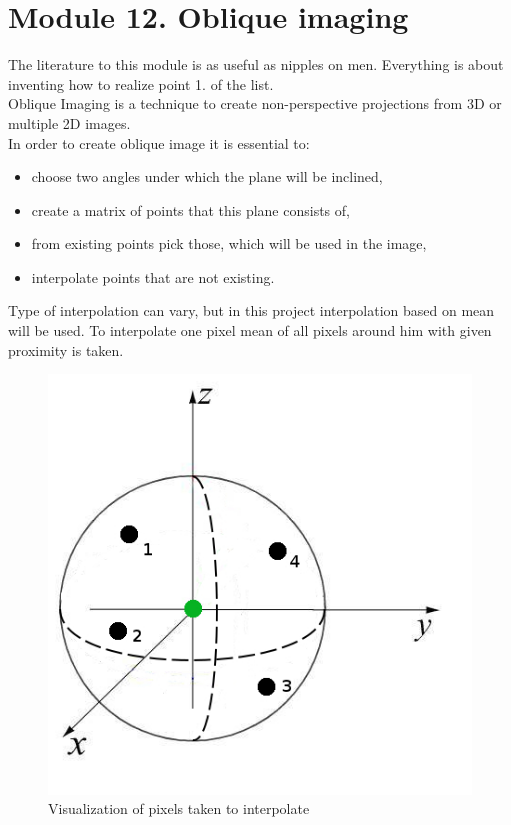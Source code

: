 \section{Module 12. Oblique imaging}

\indent The literature to this module is as useful as nipples on
men. Everything is about inventing how to realize point 1. of the
list. \\
 \indent Oblique Imaging is a technique to create non-perspective
projections from 3D or multiple 2D images.\\

\indent In order to create oblique image it is essential to: 
\begin{itemize}
\item choose two angles under which the plane will be inclined, 
\item create a matrix of points that this plane consists of, 
\item from existing points pick those, which will be used in the image, 
\item interpolate points that are not existing. 
\end{itemize}
\indent Type of interpolation can vary, but in this project interpolation
based on mean will be used. To interpolate one pixel mean of all pixels
around him with given proximity is taken.

\begin{figure}[H]
\centering{}\includegraphics[scale=0.7]{figures/m11_spherexyz}\caption{Visualization of pixels taken to interpolate}
\label{fig:figures/m11_spherexyz } 
\end{figure}